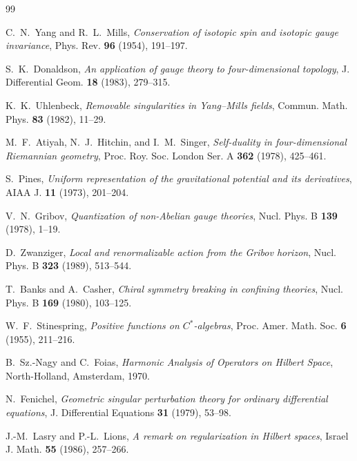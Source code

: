 \documentclass[11pt,a4paper,reqno]{article}
\theoremstyle{plain}
\theoremstyle{definition}
\theoremstyle{remark}
\numberwithin{equation}{section}
\begin{document}
\begin{thebibliography}{99}
\sloppy

C.~N.~Yang and R.~L.~Mills,
\textit{Conservation of isotopic spin and isotopic gauge invariance},
Phys. Rev. \textbf{96} (1954), 191--197.

S.~K.~Donaldson,
\textit{An application of gauge theory to four-dimensional topology},
J. Differential Geom. \textbf{18} (1983), 279--315.

K.~K.~Uhlenbeck,
\textit{Removable singularities in Yang--Mills fields},
Commun. Math. Phys. \textbf{83} (1982), 11--29.

M.~F.~Atiyah, N.~J.~Hitchin, and I.~M.~Singer,
\textit{Self-duality in four-dimensional Riemannian geometry},
Proc. Roy. Soc. London Ser. A \textbf{362} (1978), 425--461.

S.~Pines,
\textit{Uniform representation of the gravitational potential and its derivatives},
AIAA J. \textbf{11} (1973), 201--204.

V.~N.~Gribov,
\textit{Quantization of non-Abelian gauge theories},
Nucl. Phys. B \textbf{139} (1978), 1--19.

D.~Zwanziger,
\textit{Local and renormalizable action from the Gribov horizon},
Nucl. Phys. B \textbf{323} (1989), 513--544.

T.~Banks and A.~Casher,
\textit{Chiral symmetry breaking in confining theories},
Nucl. Phys. B \textbf{169} (1980), 103--125.

W.~F.~Stinespring,
\textit{Positive functions on $C^*$-algebras},
Proc. Amer. Math. Soc. \textbf{6} (1955), 211--216.

B.~Sz.-Nagy and C.~Foias,
\textit{Harmonic Analysis of Operators on Hilbert Space},
North-Holland, Amsterdam, 1970.

N.~Fenichel,
\textit{Geometric singular perturbation theory for ordinary differential equations},
J. Differential Equations \textbf{31} (1979), 53--98.

J.-M.~Lasry and P.-L.~Lions,
\textit{A remark on regularization in Hilbert spaces},
Israel J. Math. \textbf{55} (1986), 257--266.


\end{thebibliography}
\end{document}
